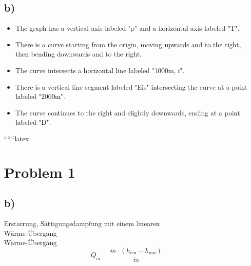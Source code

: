 

\subsection*{b)}

\begin{itemize}
    \item The graph has a vertical axis labeled "p" and a horizontal axis labeled "T".
    \item There is a curve starting from the origin, moving upwards and to the right, then bending downwards and to the right.
    \item The curve intersects a horizontal line labeled "1000m, i".
    \item There is a vertical line segment labeled "Eis" intersecting the curve at a point labeled "2000m".
    \item The curve continues to the right and slightly downwards, ending at a point labeled "D".
\end{itemize}

``````latex


\section*{Problem 1}



\subsection*{b)}

Erstarrung, Sättigungsdampfung mit einem linearen \\
Wärme-Übergang \\
Wärme-Übergang \\
\[
Q_{\text{in}} = \frac{\dot{m} \cdot (h_{\text{ein}} - h_{\text{aus}})}{\dot{m}}
\]